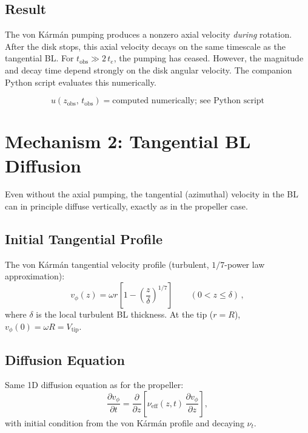 \documentclass[11pt,a4paper]{article}
\begin{document}
\subsection{Result}

The von K\'arm\'an pumping produces a nonzero axial velocity
\emph{during} rotation. After the disk stops, this axial velocity
decays on the same timescale as the tangential BL. For
$t_\mathrm{obs} \gg 2\,t_e$, the pumping has ceased. However, the
magnitude and decay time depend strongly on the disk angular velocity.
The companion Python script evaluates this numerically.

\begin{equation}
  \boxed{u(z_\mathrm{obs},\, t_\mathrm{obs}) = \text{computed numerically;
  see Python script}}
\end{equation}


\section{Mechanism 2: Tangential BL Diffusion}
\label{sec:tangential}

Even without the axial pumping, the tangential (azimuthal) velocity
in the BL can in principle diffuse vertically, exactly as in the
propeller case.

\subsection{Initial Tangential Profile}

The von K\'arm\'an tangential velocity profile (turbulent,
$1/7$-power law approximation):
\begin{equation}
  v_\phi(z) = \omega r \left[1 - \left(\frac{z}{\delta}\right)^{1/7}
    \right]
  \qquad (0 < z \le \delta)\,,
\end{equation}
where $\delta$ is the local turbulent BL thickness. At the tip
($r = R$), $v_\phi(0) = \omega R = V_\mathrm{tip}$.

\subsection{Diffusion Equation}

Same 1D diffusion equation as for the propeller:
\begin{equation}
  \frac{\partial v_\phi}{\partial t}
  = \frac{\partial}{\partial z}
    \left[\nu_\mathrm{eff}(z,t)\,\frac{\partial v_\phi}{\partial z}
    \right],
\end{equation}
with initial condition from the von K\'arm\'an profile and decaying
$\nu_t$.
\end{document}
